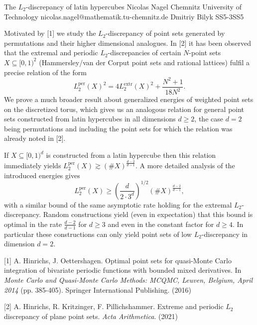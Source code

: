 	\begin{talk}
		{The $L_2$-discrepancy of latin hypercubes}%
		{Nicolas Nagel}%
		{Chemnitz University of Technology}%
		{nicolas.nagel@mathematik.tu-chemnitz.de}%
		{Dmitriy Bilyk}%
{}{}{SS5-3}{SS5}

		
		
		
		
		Motivated by [1] we study the $L_2$-discrepancy of point sets generated by permutations and their higher dimensional analogues. In [2] it has been observed that the extremal and periodic $L_2$-discrepancies of certain $N$-point sets $X \subseteq [0, 1)^2$ (Hammersley/van der Corput point sets and rational lattices) fulfil a precise relation of the form
		$$
		L_2^\text{per}(X)^2 = 4 L_2^\text{extr}(X)^2 + \frac{N^2+1}{18N^2}.
		$$
		We prove a much broader result about generalized energies of weighted point sets on the discretized torus, which gives us an analogous relation for general point sets constructed from latin hypercubes in all dimensions $d \geq 2$, the case $d = 2$ being permutations and including the point sets for which the relation was already noted in [2].
		
		If $X \subseteq [0, 1)^d$ is constructed from a latin hypercube then this relation immediately yields $L_2^\text{per}(X) \gtrsim (\#X)^{\frac{d-2}{d-1}}$. A more detailed analysis of the introduced energies gives
		$$
		L_2^\text{per} (X) \geq \left(\frac{d}{2 \cdot 3^d}\right)^{1/2} (\#X)^{\frac{d-2}{d-1}},
		$$
		with a similar bound of the same asymptotic rate holding for the extremal $L_2$-discrepancy. Random constructions yield (even in expectation) that this bound is optimal in the rate $\frac{d-2}{d-1}$ for $d \geq 3$ and even in the constant factor for $d \geq 4$. In particular these constructions can only yield point sets of low $L_2$-discrepancy in dimension $d = 2$.
		
		\medskip
		
		[1] A. Hinrichs, J. Oettershagen. Optimal point sets for quasi-Monte Carlo integration of bivariate periodic functions with bounded mixed derivatives. In \textit{Monte Carlo and Quasi-Monte Carlo Methods: MCQMC, Leuven, Belgium, April 2014} (pp. 385-405). Springer International Publishing. (2016)
		
		[2] A. Hinrichs, R. Kritzinger, F. Pillichshammer. Extreme and periodic $L_2$ discrepancy of plane point sets. \textit{Acta Arithmetica}. (2021)
	\end{talk}

